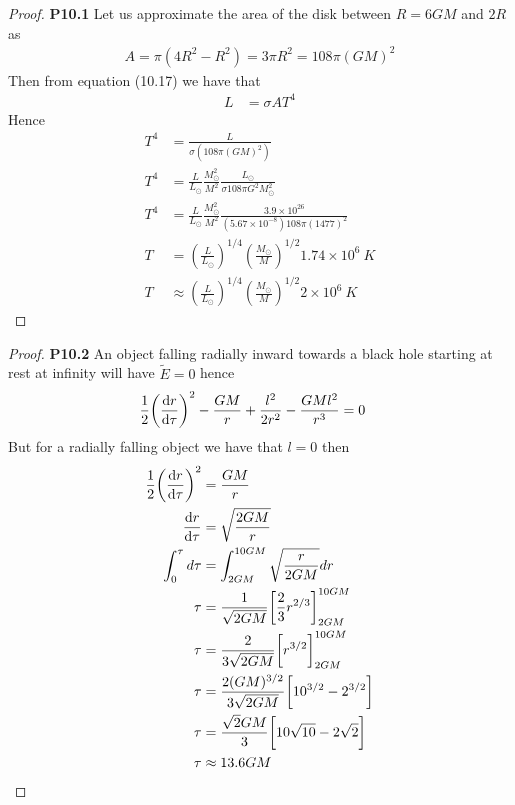 \documentclass[11pt]{article}
\theoremstyle{definition}
\begin{document}
\begin{proof}{\textbf{P10.1}}
    Let us approximate the area of the disk between $R = 6GM$ and $2R$ as
    \begin{align*}
        A = \pi(4R^2 - R^2) = 3\pi R^2 = 108\pi (GM)^2   
    \end{align*}
    Then from equation (10.17) we have that
    \begin{align*}
        L &= \sigma A T^4
    \end{align*}
    Hence
    \begin{align*}
        T^4 &= \frac{L}{\sigma (108\pi (GM)^2)}\\
        T^4 &= \frac{L}{L_\odot}\frac{M_\odot^2}{M^2}
        \frac{L_\odot}{\sigma 108\pi G^2M_\odot^2}\\
        T^4 &= \frac{L}{L_\odot}\frac{M_\odot^2}{M^2}
        \frac{3.9 \times 10^{26}}{(5.67\times 10^{-8})108\pi(1477)^2}\\
        T &= \left(\frac{L}{L_\odot}\right)^{1/4}
        \left(\frac{M_\odot}{M}\right)^{1/2}
        1.74 \times 10^6~K\\
        T &\approx \left(\frac{L}{L_\odot}\right)^{1/4}
        \left(\frac{M_\odot}{M}\right)^{1/2} 2 \times 10^6~K
    \end{align*}
\end{proof}
\cleardoublepage
\begin{proof}{\textbf{P10.2}}
    An object falling radially inward towards a black hole starting at rest
    at infinity will have $\tilde{E} = 0$ hence
    \begin{align*}
        \frac{1}{2}\bigg(\dv{r}{\tau}\bigg)^2 - \frac{GM}{r} + \frac{l^2}{2r^2}
        - \frac{GMl^2}{r^3} &= 0
    \end{align*}
    But for a radially falling object we have that $l = 0$ then
    \begin{align*}
        \frac{1}{2}\bigg(\dv{r}{\tau}\bigg)^2 &= \frac{GM}{r}\\
        \dv{r}{\tau} &= \sqrt{\frac{2GM}{r}}\\
        \int_0^\tau d\tau &= \int^{10GM}_{2GM} \sqrt{\frac{r}{2GM}} dr\\
        \tau &= \frac{1}{\sqrt{2GM}}
        \bigg[\frac{2}{3}r^{2/3}\bigg]^{10GM}_{2GM}\\
        \tau &= \frac{2}{3\sqrt{2GM}}\bigg[r^{3/2}\bigg]^{10GM}_{2GM}\\
        \tau &= \frac{2(GM)^{3/2}}{3\sqrt{2GM}}\bigg[10^{3/2} - 2^{3/2}\bigg]\\
        \tau &= \frac{\sqrt{2}GM}{3}\bigg[10\sqrt{10}-2\sqrt{2}\bigg]\\
        \tau &\approx 13.6GM
    \end{align*}
\end{proof}
\end{document}
